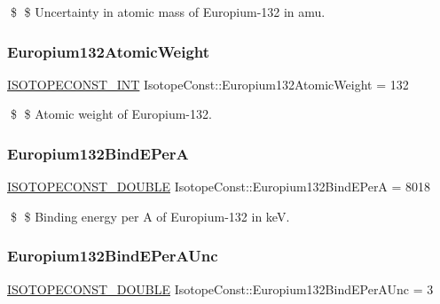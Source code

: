 \$ \$ Uncertainty in atomic mass of Europium-\/132 in amu. \mbox{\label{group___isotope_const-_europium-_eu132_gad2a5e4ca46b82830f763330095226487}} 
\subsubsection{\texorpdfstring{Europium132\+Atomic\+Weight}{Europium132AtomicWeight}}
{\footnotesize\ttfamily \mbox{\hyperlink{group___isotope_const-_macros_ga5f18360b3e99483a35c32d789e62621c}{I\+S\+O\+T\+O\+P\+E\+C\+O\+N\+S\+T\+\_\+\+I\+NT}} Isotope\+Const\+::\+Europium132\+Atomic\+Weight = 132}

\$ \$ Atomic weight of Europium-\/132. \mbox{\label{group___isotope_const-_europium-_eu132_gacab533586b8af0be72956f4742488ef9}} 
\subsubsection{\texorpdfstring{Europium132\+Bind\+E\+PerA}{Europium132BindEPerA}}
{\footnotesize\ttfamily \mbox{\hyperlink{group___isotope_const-_macros_ga8f45a7272ce02c0b4c65c44636ed719a}{I\+S\+O\+T\+O\+P\+E\+C\+O\+N\+S\+T\+\_\+\+D\+O\+U\+B\+LE}} Isotope\+Const\+::\+Europium132\+Bind\+E\+PerA = 8018}

\$ \$ Binding energy per A of Europium-\/132 in keV. \mbox{\label{group___isotope_const-_europium-_eu132_gaa7402b56ca6d2c9ca95ce45224bc5833}} 
\subsubsection{\texorpdfstring{Europium132\+Bind\+E\+Per\+A\+Unc}{Europium132BindEPerAUnc}}
{\footnotesize\ttfamily \mbox{\hyperlink{group___isotope_const-_macros_ga8f45a7272ce02c0b4c65c44636ed719a}{I\+S\+O\+T\+O\+P\+E\+C\+O\+N\+S\+T\+\_\+\+D\+O\+U\+B\+LE}} Isotope\+Const\+::\+Europium132\+Bind\+E\+Per\+A\+Unc = 3}

